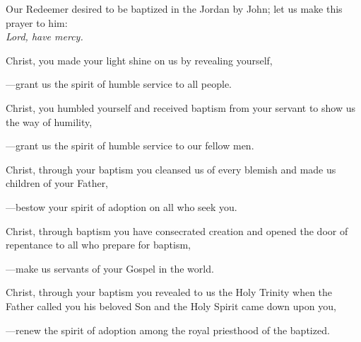 \intercessions\indent

\begin{hangpar}

Our Redeemer desired to be baptized in the Jordan by John; let us make this prayer to him:\\
\emph{Lord, have mercy.}

\medskip Christ, you made your light shine on us by revealing yourself,

{\color{red}---\thinspace}grant us the spirit of humble service to all people.

\medskip Christ, you humbled yourself and received baptism from your servant to show us the way of humility,

{\color{red}---\thinspace}grant us the spirit of humble service to our fellow men.

\medskip Christ, through your baptism you cleansed us of every blemish and made us children of your Father,

{\color{red}---\thinspace}bestow your spirit of adoption on all who seek you.

\medskip Christ, through baptism you have consecrated creation and opened the door of repentance to all who prepare for baptism,

{\color{red}---\thinspace}make us servants of your Gospel in the world.

\medskip Christ, through your baptism you revealed to us the Holy Trinity when the Father called you his beloved Son and the Holy Spirit came down upon you,

{\color{red}---\thinspace}renew the spirit of adoption among the royal priesthood of the baptized.

\medskip

\end{hangpar}